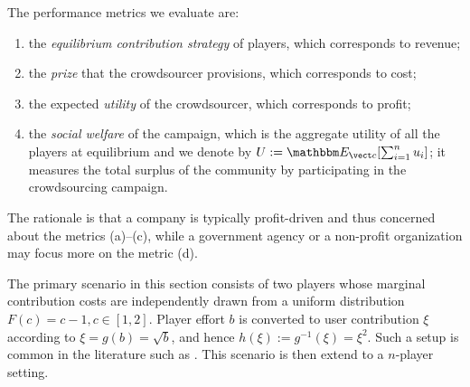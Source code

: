 \documentclass{sig-alternate-10pt}
\begin{document}
The performance metrics we evaluate are: 
\begin{enumerate}[label=(\alph*)]
\item the {\em equilibrium contribution strategy} of players, which corresponds to revenue;
\item the {\em prize} that the crowdsourcer provisions, which corresponds to cost;
\item the expected {\em utility} of the crowdsourcer, which corresponds to profit;
\item the {\em social welfare} of the campaign, which is the aggregate utility of all the players at equilibrium and we denote by $U:=\mathbbm E_{\vect c}[\sum_{i=1}^n u_i]$; it measures the total surplus of the community by participating in the crowdsourcing campaign.
\end{enumerate}
The rationale is that a company is typically profit-driven and thus concerned about the metrics (a)--(c), while a government agency or a non-profit organization may focus more on the metric (d).

The primary scenario in this section consists of two players whose marginal contribution costs are independently drawn from a uniform distribution $F(c)=c-1, c\in[1,2]$. Player effort $b$ is converted to user contribution $\xi$ according to $\xi=g(b)=\sqrt b$, and hence $h(\xi):=g^{-1}(\xi)=\xi^2$. Such a setup is common in the literature such as \cite{Fey08,Ryvkin10}.  This scenario is then extend to a $n$-player setting.
\end{document}

